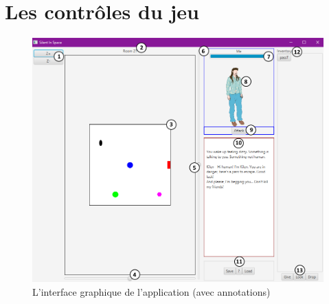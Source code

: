 \documentclass[./standalone.tex]{subfiles}
\begin{document}
\newpage

\section{Les contrôles du jeu}

	\begin{center}
	   \begin{figure}[h!]
	   \includegraphics[scale=0.6]{images/UI.png}
	   \caption{L'interface graphique de l'application (avec annotations)}
	   \label{UI}
	   \end{figure}
	\end{center}
	
\end{document}

